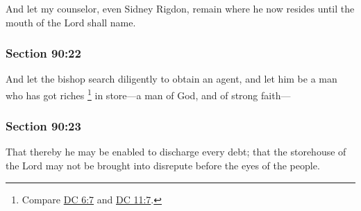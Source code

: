 		And let my counselor, even Sidney Rigdon, remain where he now resides until the mouth of the Lord shall name.


	\subsubsection{Section 90:22} %
		\label{DC90-22}

		And let the bishop search diligently to obtain an agent, and let him be a man who has got riches%
			\footnote{%
				Compare \hyperref[DC6-7]{DC 6:7} and \hyperref[DC11-7]{DC 11:7}.
				}
		in store---a man of God, and of strong faith---


	\subsubsection{Section 90:23} %
		\label{DC90-23}

		That thereby he may be enabled to discharge every debt; that the storehouse of the Lord may not be brought into disrepute before the eyes of the people.


